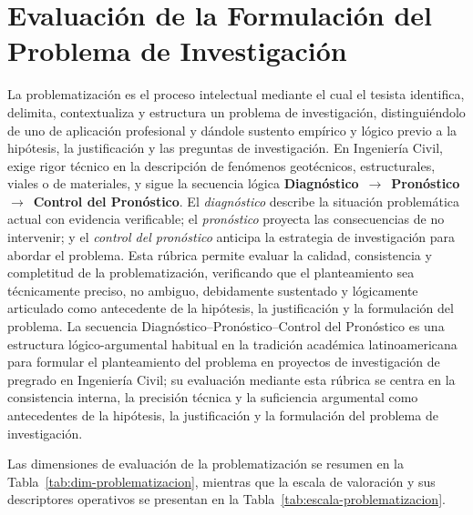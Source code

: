 \clearpage
\section{Evaluación de la Formulación del Problema de Investigación}

{\footnotesize
La problematización es el proceso intelectual mediante el cual el tesista identifica, delimita, contextualiza y estructura un problema de investigación, distinguiéndolo de uno de aplicación profesional y dándole sustento empírico y lógico previo a la hipótesis, la justificación y las preguntas de investigación. En Ingeniería Civil, exige rigor técnico en la descripción de fenómenos geotécnicos, estructurales, viales o de materiales, y sigue la secuencia lógica \textbf{Diagnóstico}~$\rightarrow$~\textbf{Pronóstico}~$\rightarrow$~\textbf{Control del Pronóstico}. El \textit{diagnóstico} describe la situación problemática actual con evidencia verificable; el \textit{pronóstico} proyecta las consecuencias de no intervenir; y el \textit{control del pronóstico} anticipa la estrategia de investigación para abordar el problema. Esta rúbrica permite evaluar la calidad, consistencia y completitud de la problematización, verificando que el planteamiento sea técnicamente preciso, no ambiguo, debidamente sustentado y lógicamente articulado como antecedente de la hipótesis, la justificación y la formulación del problema. La secuencia Diagnóstico--Pronóstico--Control del Pronóstico es una estructura lógico-argumental habitual en la tradición académica latinoamericana para formular el planteamiento del problema en proyectos de investigación de pregrado en Ingeniería Civil; su evaluación mediante esta rúbrica se centra en la consistencia interna, la precisión técnica y la suficiencia argumental como antecedentes de la hipótesis, la justificación y la formulación del problema de investigación.\par
}
Las dimensiones de evaluación de la problematización se resumen en la Tabla~\ref{tab:dim-problematizacion}, mientras que la escala de valoración y sus descriptores operativos se presentan en la Tabla~\ref{tab:escala-problematizacion}.

